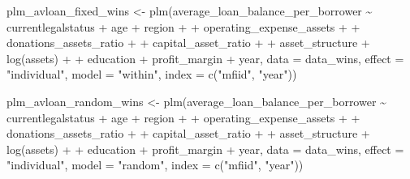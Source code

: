 \documentclass[a4paper,nobind]{templates/ociamthesis}
\newenvironment{Shaded}{\begin{snugshade}}{\end{snugshade}}
\newcommand{\AttributeTok}[1]{\textcolor[rgb]{0.77,0.63,0.00}{#1}}
\newcommand{\FunctionTok}[1]{\textcolor[rgb]{0.00,0.00,0.00}{#1}}
\newcommand{\NormalTok}[1]{#1}
\newcommand{\OtherTok}[1]{\textcolor[rgb]{0.56,0.35,0.01}{#1}}
\newcommand{\SpecialCharTok}[1]{\textcolor[rgb]{0.00,0.00,0.00}{#1}}
\newcommand{\StringTok}[1]{\textcolor[rgb]{0.31,0.60,0.02}{#1}}
\renewenvironment{Shaded}
{
  \vspace{10pt}%
  \begin{snugshade}%
}{%
  \end{snugshade}%
  \vspace{8pt}%
}
\begin{document}
\begin{landscape}
\begin{Shaded}
\begin{Highlighting}[]
\NormalTok{plm\_avloan\_fixed\_wins }\OtherTok{\textless{}{-}} \FunctionTok{plm}\NormalTok{(average\_loan\_balance\_per\_borrower }\SpecialCharTok{\textasciitilde{}}\NormalTok{ currentlegalstatus }\SpecialCharTok{+}\NormalTok{ age }\SpecialCharTok{+}\NormalTok{ region }\SpecialCharTok{+}
\SpecialCharTok{+}\NormalTok{           operating\_expense\_assets }\SpecialCharTok{+} 
\SpecialCharTok{+}\NormalTok{           donations\_assets\_ratio }\SpecialCharTok{+} 
\SpecialCharTok{+}\NormalTok{           capital\_asset\_ratio }\SpecialCharTok{+}
\SpecialCharTok{+}\NormalTok{           asset\_structure }\SpecialCharTok{+} \FunctionTok{log}\NormalTok{(assets) }\SpecialCharTok{+} 
\SpecialCharTok{+}\NormalTok{           education }\SpecialCharTok{+}\NormalTok{ profit\_margin }\SpecialCharTok{+}\NormalTok{ year, }
               \AttributeTok{data =}\NormalTok{ data\_wins, }\AttributeTok{effect =} \StringTok{"individual"}\NormalTok{, }\AttributeTok{model =} \StringTok{"within"}\NormalTok{, }
      \AttributeTok{index =} \FunctionTok{c}\NormalTok{(}\StringTok{"mfiid"}\NormalTok{, }\StringTok{"year"}\NormalTok{))}

\NormalTok{plm\_avloan\_random\_wins }\OtherTok{\textless{}{-}} \FunctionTok{plm}\NormalTok{(average\_loan\_balance\_per\_borrower }\SpecialCharTok{\textasciitilde{}}\NormalTok{ currentlegalstatus }\SpecialCharTok{+}\NormalTok{ age }\SpecialCharTok{+}\NormalTok{ region }\SpecialCharTok{+}
\SpecialCharTok{+}\NormalTok{           operating\_expense\_assets }\SpecialCharTok{+} 
\SpecialCharTok{+}\NormalTok{           donations\_assets\_ratio }\SpecialCharTok{+} 
\SpecialCharTok{+}\NormalTok{           capital\_asset\_ratio }\SpecialCharTok{+}
\SpecialCharTok{+}\NormalTok{           asset\_structure }\SpecialCharTok{+} \FunctionTok{log}\NormalTok{(assets) }\SpecialCharTok{+} 
\SpecialCharTok{+}\NormalTok{           education }\SpecialCharTok{+}\NormalTok{ profit\_margin }\SpecialCharTok{+}\NormalTok{ year, }
               \AttributeTok{data =}\NormalTok{ data\_wins, }\AttributeTok{effect =} \StringTok{"individual"}\NormalTok{, }\AttributeTok{model =} \StringTok{"random"}\NormalTok{, }
      \AttributeTok{index =} \FunctionTok{c}\NormalTok{(}\StringTok{"mfiid"}\NormalTok{, }\StringTok{"year"}\NormalTok{))}


\end{Highlighting}
\end{Shaded}
\end{landscape}
\end{document}
